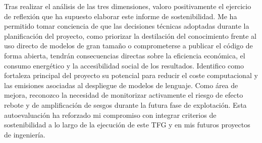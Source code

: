 \documentclass[11pt,a4paper]{article}
\begin{document}
Tras realizar el análisis de las tres dimensiones, valoro positivamente el ejercicio de reflexión que ha supuesto elaborar este informe de sostenibilidad. Me ha permitido tomar conciencia de que las decisiones técnicas adoptadas durante la planificación del proyecto, como priorizar la destilación del conocimiento frente al uso directo de modelos de gran tamaño o comprometerse a publicar el código de forma abierta, tendrán consecuencias directas sobre la eficiencia económica, el consumo energético y la accesibilidad social de los resultados. Identifico como fortaleza principal del proyecto su potencial para reducir el coste computacional y las emisiones asociadas al despliegue de modelos de lenguaje. Como área de mejora, reconozco la necesidad de monitorizar activamente el riesgo de efecto rebote y de amplificación de sesgos durante la futura fase de explotación. Esta autoevaluación ha reforzado mi compromiso con integrar criterios de sostenibilidad a lo largo de la ejecución de este TFG y en mis futuros proyectos de ingeniería.
\end{document}
